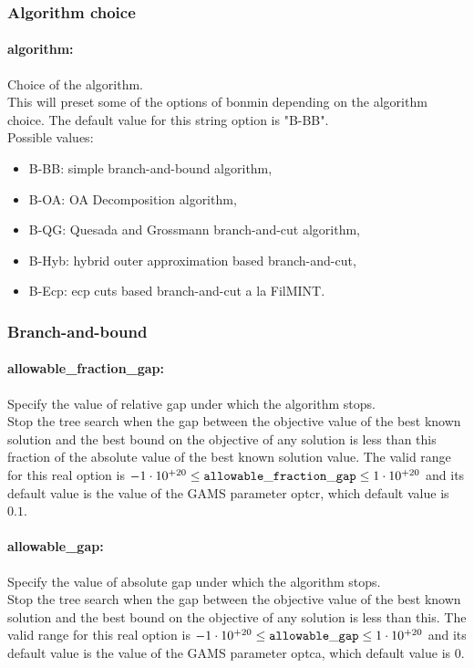 \subsubsection{Algorithm choice}
\label{sec:Bonmin_algorithm_choice}
\paragraph{algorithm:} Choice of the algorithm. $\;$ \\
 This will preset some of the options of bonmin
depending on the algorithm choice.
The default value for this string option is "B-BB".
\\ 
Possible values:
\begin{itemize}
   \item B-BB: simple branch-and-bound algorithm,
   \item B-OA: OA Decomposition algorithm,
   \item B-QG: Quesada and Grossmann branch-and-cut algorithm,
   \item B-Hyb: hybrid outer approximation based branch-and-cut,
   \item B-Ecp: ecp cuts based branch-and-cut a la FilMINT.
\end{itemize}

\subsubsection{Branch-and-bound}
\label{sec:bonmin_branch-and-bound_options}
\paragraph{allowable\_fraction\_gap:} Specify the value of relative gap under which the algorithm stops. $\;$ \\
 Stop the tree search when the gap between the
objective value of the best known solution and
the best bound on the objective of any solution
is less than this fraction of the absolute value
of the best known solution value. The valid range for this real option is 
$-1 \cdot 10^{+20} \le {\tt allowable\_fraction\_gap } \le 1 \cdot 10^{+20}$
and its default value is the value of the GAMS parameter optcr, which default value is $0.1$.


\paragraph{allowable\_gap:} Specify the value of absolute gap under which the algorithm stops. $\;$ \\
 Stop the tree search when the gap between the
objective value of the best known solution and
the best bound on the objective of any solution
is less than this. The valid range for this real option is 
$-1 \cdot 10^{+20} \le {\tt allowable\_gap } \le 1 \cdot 10^{+20}$
and its default value is the value of the GAMS parameter optca, which default value is $0$.



